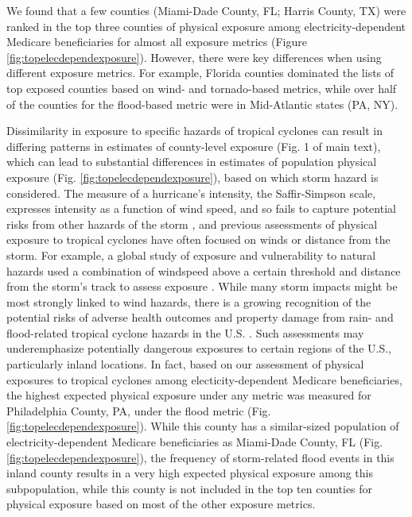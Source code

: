 \documentclass[fleqn,10pt,lineno]{olplainarticle}
\begin{document}
We found that a few counties (Miami-Dade County, FL; Harris County, TX) were ranked in the top three counties of physical exposure among electricity-dependent Medicare beneficiaries for almost all exposure metrics (Figure \ref{fig:topelecdependexposure}). However, there were key differences when using different exposure metrics. For example, Florida counties dominated the lists of top exposed counties based on wind- and tornado-based metrics, while over half of the counties for the flood-based metric were in Mid-Atlantic states (PA, NY).

Dissimilarity in exposure to specific hazards of tropical cyclones can result in differing patterns in estimates of county-level exposure (Fig. 1 of main text), which can lead to substantial differences in estimates of population physical exposure (Fig. \ref{fig:topelecdependexposure}), based on which storm hazard is considered. The measure of a hurricane's intensity, the Saffir-Simpson scale, expresses intensity as a function of wind speed, and so fails to capture potential risks from other hazards of the storm \cite{smith2009}, and previous assessments of physical exposure to tropical cyclones have often focused on winds or distance from the storm. For example, a global study of exposure and vulnerability to natural hazards used a combination of windspeed above a certain threshold and distance from the storm's track to assess exposure \cite{peduzzi2009assessing}. While many storm impacts might be most strongly linked to wind hazards, there is a growing recognition of the potential risks of adverse health outcomes and property damage from rain- and flood-related tropical cyclone hazards in the U.S. \cite{smith2009}. Such assessments may underemphasize potentially dangerous exposures to certain regions of the U.S., particularly inland locations. In fact, based on our assessment of physical exposures to tropical cyclones among electicity-dependent Medicare beneficiaries, the highest expected physical exposure under any metric was measured for Philadelphia County, PA, under the flood metric (Fig. \ref{fig:topelecdependexposure}). While this county has a similar-sized population of electricity-dependent Medicare beneficiaries as Miami-Dade County, FL (Fig. \ref{fig:topelecdependexposure}), the frequency of storm-related flood events in this inland county results in a very high expected physical exposure among this subpopulation, while this county is not included in the top ten counties for physical exposure based on most of the other exposure metrics.
\end{document}
